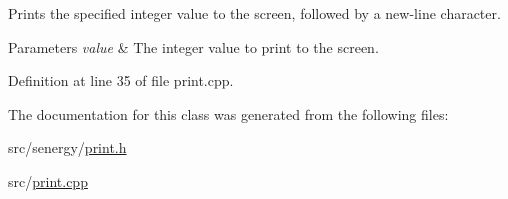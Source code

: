 Prints the specified integer value to the screen, followed by a new-\/line character. 


\begin{DoxyParams}{Parameters}
{\em value} & The integer value to print to the screen. \\
\hline
\end{DoxyParams}


Definition at line 35 of file print.\-cpp.



The documentation for this class was generated from the following files\-:\begin{DoxyCompactItemize}
\item 
src/senergy/\hyperlink{print_8h}{print.\-h}\item 
src/\hyperlink{print_8cpp}{print.\-cpp}\end{DoxyCompactItemize}
